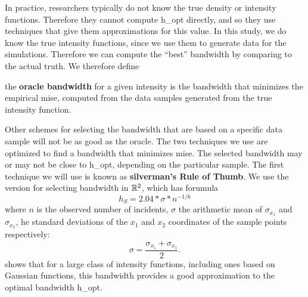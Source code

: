 In practice,
researchers typically do not know the true density or intensity functions.
Therefore they cannot compute \gls{h_opt} directly,
and so they use techniques that give them approximations for this value.
In this study,
we do know the true intensity functions,
since we use them to generate data for the simulations.
Therefore we can compute the ``best'' bandwidth by comparing to the actual truth.
We therefore define
\begin{defn}
    the \textbf{\gls{oracle bandwidth}} for a given \gls{intensity} is the bandwidth that minimizes the empirical \gls{mise},
    computed from the data samples generated from the true \gls{intensity} function.
\end{defn}
Other schemes for selecting the bandwidth that are based on a specific data sample will not be as good as the \gls{oracle}.
The two techniques we use are optimized to find a bandwidth that minimizes \gls{mise}.
The selected bandwidth may or may not be close to \gls{h_opt},
depending on the particular sample.
The first technique we will use is known as \textbf{\Gls{silverman}'s Rule of Thumb}.
We use the version for selecting bandwidth in $\mathbb{R}^2$,
which has forumula
\begin{equation}
    \label{eq:silverman}
    h_S = 2.04 * \sigma * n^{-1/6}%
\end{equation}
where $n$ is the observed number of incidents,
$\sigma$ the arithmetic mean of $\sigma_{x_1}$ and $\sigma_{x_2}$,
he standard deviations of the $x_1$ and $x_2$ coordinates of the sample points respectively:
\begin{equation}
    \sigma = \frac{\sigma_{x_1} + \sigma_{x_1}}{2} \text{.}
\end{equation}
\citet{silverman1986density} shows that for a large class of intensity functions,
including ones based on Gaussian functions,
this bandwidth provides a good approximation to the optimal bandwidth \gls{h_opt}. 


